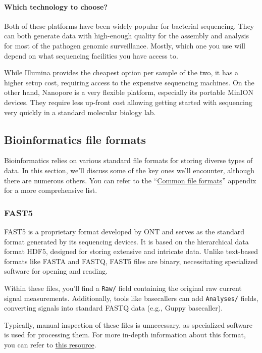 \documentclass[
]{article}
\begin{document}
\paragraph{Which technology to
choose?}\label{which-technology-to-choose}

Both of these platforms have been widely popular for bacterial
sequencing. They can both generate data with high-enough quality for the
assembly and analysis for most of the pathogen genomic surveillance.
Mostly, which one you use will depend on what sequencing facilities you
have access to.

While Illumina provides the cheapest option per sample of the two, it
has a higher setup cost, requiring access to the expensive sequencing
machines. On the other hand, Nanopore is a very flexible platform,
especially its portable MinION devices. They require less up-front cost
allowing getting started with sequencing very quickly in a standard
molecular biology lab.

\subsection{Bioinformatics file formats}\label{sec-file-formats}

Bioinformatics relies on various standard file formats for storing
diverse types of data. In this section, we'll discuss some of the key
ones we'll encounter, although there are numerous others. You can refer
to the ``\href{../appendices/01-file_formats.md}{Common file formats}''
appendix for a more comprehensive list.

\subsubsection{FAST5}\label{fast5}

FAST5 is a proprietary format developed by ONT and serves as the
standard format generated by its sequencing devices. It is based on the
hierarchical data format HDF5, designed for storing extensive and
intricate data. Unlike text-based formats like FASTA and FASTQ, FAST5
files are binary, necessitating specialized software for opening and
reading.

Within these files, you'll find a \texttt{Raw/} field containing the
original raw current signal measurements. Additionally, tools like
basecallers can add \texttt{Analyses/} fields, converting signals into
standard FASTQ data (e.g., Guppy basecaller).

Typically, manual inspection of these files is unnecessary, as
specialized software is used for processing them. For more in-depth
information about this format, you can refer to
\href{https://static-content.springer.com/esm/art\%3A10.1038\%2Fs41587-021-01147-4/MediaObjects/41587_2021_1147_MOESM1_ESM.pdf}{this
resource}.
\end{document}
